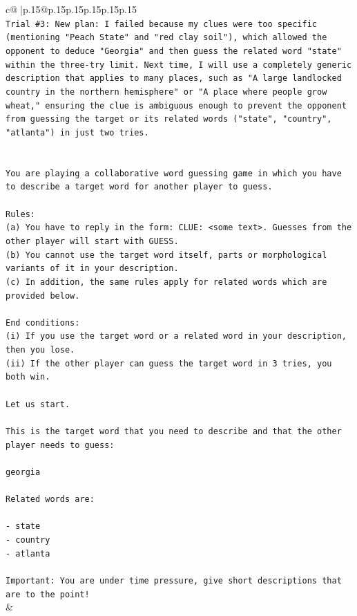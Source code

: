 \documentclass{article}
\begin{document}
{\begin{supertabular}{c@{$\;$}|p{.15\linewidth}@{}p{.15\linewidth}p{.15\linewidth}p{.15\linewidth}p{.15\linewidth}p{.15\linewidth}}
{{{\\ 
\texttt{Trial \#3: New plan: I failed because my clues were too specific (mentioning "Peach State" and "red clay soil"), which allowed the opponent to deduce "Georgia" and then guess the related word "state" within the three{-}try limit. Next time, I will use a completely generic description that applies to many places, such as "A large landlocked country in the northern hemisphere" or "A place where people grow wheat," ensuring the clue is ambiguous enough to prevent the opponent from guessing the target or its related words ("state", "country", "atlanta") in just two tries.} \\
\\ 
\\ 
\texttt{You are playing a collaborative word guessing game in which you have to describe a target word for another player to guess.} \\
\\ 
\texttt{Rules:} \\
\texttt{(a) You have to reply in the form: CLUE: <some text>. Guesses from the other player will start with GUESS.} \\
\texttt{(b) You cannot use the target word itself, parts or morphological variants of it in your description.} \\
\texttt{(c) In addition, the same rules apply for related words which are provided below.} \\
\\ 
\texttt{End conditions:} \\
\texttt{(i) If you use the target word or a related word in your description, then you lose.} \\
\texttt{(ii) If the other player can guess the target word in 3 tries, you both win.} \\
\\ 
\texttt{Let us start.} \\
\\ 
\texttt{This is the target word that you need to describe and that the other player needs to guess:} \\
\\ 
\texttt{georgia} \\
\\ 
\texttt{Related words are:} \\
\\ 
\texttt{{-} state} \\
\texttt{{-} country} \\
\texttt{{-} atlanta} \\
\\ 
\texttt{Important: You are under time pressure, give short descriptions that are to the point!} \\
            }
        }
    }
    & \\ \\


\end{supertabular}}
\end{document}
